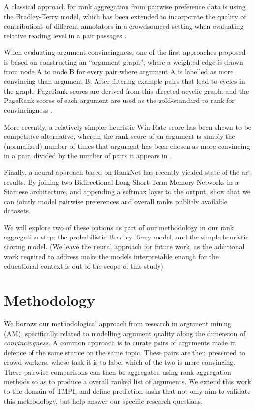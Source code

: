 \documentclass[sigconf]{acmart}
\begin{document}
A classical approach for rank aggregation from pairwise preference data is 
using the Bradley-Terry model, which has been extended to incorporate the 
quality of contributions of different annotators in a crowdsourced setting when 
evaluating relative reading level in a pair passages \cite{chen_pairwise_2013}. 

When evaluating argument convincingness, one of the first approaches proposed 
is based on constructing an ``argument graph'', where a weighted edge is drawn 
from node A to node B for every pair where argument A is labelled as more 
convincing than argument B. 
After filtering example pairs that lead to cycles in the graph, PageRank scores 
are derived from this directed acyclic graph, and the PageRank 
scores of each argument are used as the gold-standard to rank for 
convincingness \cite{habernal_which_2016}.

More recently, a relatively simpler heuristic Win-Rate score has been shown to 
be competitive alternative, wherein the rank score of an argument is simply the 
(normalized) number of times that argument has been chosen as more convincing 
in a pair, divided by the number of pairs it appears in
\cite{potash_ranking_2019}.

Finally, a neural approach based on RankNet has recently yielded state of the 
art results. By joining two Bidirectional Long-Short-Term Memory Networks in a 
Siamese architecture, and appending a softmax layer to the output, 
\cite{gleize_are_2019} show that we can jointly model pairwise preferences and 
overall ranks publicly available datasets.

We will explore two of these options as part of our methodology in our rank 
aggregation step: the probabilistic Bradley-Terry model, and the simple 
heuristic scoring model. 
(We leave the neural approach for future work, as the additional work required 
to address make the models interpretable enough for the educational context is 
out of the scope of this study)


\section{Methodology}

We borrow our methodological approach from research in argument mining (AM), 
specifically related to modelling argument quality along the dimension of 
\textit{convincingness}.
A common approach is to curate pairs of arguments made in defence of the same 
stance on the same topic.
These pairs are then presented to crowd-workers, whose task it is to label 
which of the two is more convincing. 
These pairwise comparisons can then be aggregated using rank-aggregation 
methods so as to produce a overall ranked list of arguments.
We extend this work to the domain of TMPI, and define prediction tasks that not 
only aim to validate this methodology, but help answer our specific research 
questions.
\end{document}
